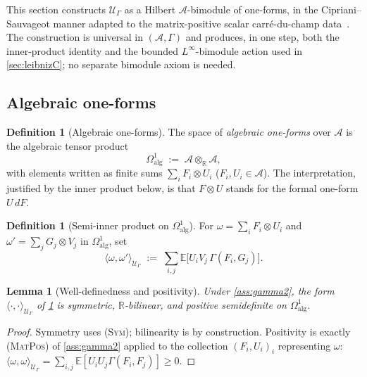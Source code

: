 \documentclass[11pt,reqno]{amsart}
\theoremstyle{plain}
\newtheorem{lemma}[theorem]{Lemma}
\theoremstyle{definition}
\newtheorem{definition}[theorem]{Definition}
\theoremstyle{remark}
\newcommand{\R}{\mathbb{R}}
\newcommand{\E}{\mathbb{E}}
\newcommand{\cA}{\mathcal A}
\newcommand{\cU}{\mathcal U}
\begin{document}
This section constructs $\cU_{\Gamma}$ as a Hilbert
$\cA$-bimodule of one-forms, in the Cipriani--Sauvageot manner
adapted to the matrix-positive scalar carr\'e-du-champ
data~\cite{CiprianiSauvageot}. The construction is universal in
$(\cA,\Gamma)$ and produces, in one step, both the inner-product
identity and the bounded $L^{\infty}$-bimodule action used in
\cref{sec:leibnizC}; no separate bimodule axiom is needed.

\subsection{Algebraic one-forms}\label{sec:moduleA-alg}

\begin{definition}[Algebraic one-forms]\label{def:alg-forms}
The space of \emph{algebraic one-forms} over $\cA$ is the
algebraic tensor product
\[
  \Omega^{1}_{\mathrm{alg}}\;:=\;\cA\otimes_{\R}\cA,
\]
with elements written as finite sums $\sum_{i}F_{i}\otimes U_{i}$
($F_{i},U_{i}\in\cA$). The interpretation, justified by the
inner product below, is that $F\otimes U$ stands for the formal
one-form $U\,dF$.
\end{definition}

\begin{definition}[Semi-inner product on $\Omega^{1}_{\mathrm{alg}}$]\label{def:semi-IP}
For $\omega=\sum_{i}F_{i}\otimes U_{i}$ and
$\omega'=\sum_{j}G_{j}\otimes V_{j}$ in $\Omega^{1}_{\mathrm{alg}}$,
set
\begin{equation}\label{eq:semi-IP}
  \langle\omega,\omega'\rangle_{\cU_{\Gamma}}
  \;:=\;\sum_{i,j}\E\!\bigl[U_{i}V_{j}\,\Gamma(F_{i},G_{j})\bigr].
\end{equation}
\end{definition}

\begin{lemma}[Well-definedness and positivity]\label{lem:semi-IP-PSD}
Under \cref{ass:gamma2}, the form
$\langle\cdot,\cdot\rangle_{\cU_{\Gamma}}$ of
\cref{def:semi-IP} is symmetric, $\R$-bilinear, and positive
semidefinite on $\Omega^{1}_{\mathrm{alg}}$.
\end{lemma}

\begin{proof}
Symmetry uses \textsc{(Sym)}; bilinearity is by construction.
Positivity is exactly \textsc{(MatPos)} of \cref{ass:gamma2}
applied to the collection $(F_{i},U_{i})_{i}$ representing
$\omega$:
$\langle\omega,\omega\rangle_{\cU_{\Gamma}}
=\sum_{i,j}\E[U_{i}U_{j}\Gamma(F_{i},F_{j})]\ge 0$.
\end{proof}
\end{document}
